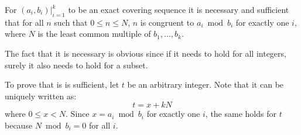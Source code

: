 \begin{solution}

\end{solution}

\begin{exercise}
    \label{ex:4-25}
    For $(a_i,b_i)\rvert_{i=1}^k$ to be an exact covering sequence it is necessary and sufficient that for all $n$ such that $ 0\leq n \leq N$, $n$ is congruent to $a_i \bmod b_i$ for exactly one $i$, where $N$ is the least common multiple of $b_1,\ldots,b_k$.
\end{exercise}
\begin{solution}
    The fact that it is necessary is obvious since if it needs to hold for all integers, surely it also needs to hold for a subset.

    To prove that is is sufficient, let $t$ be an arbitrary integer. Note that it can be uniquely written as:
    \[
        t = x + kN
    \]
    where $0\leq x < N$. Since $x = a_i\bmod b_i$ for exactly one $i$, the same holds for $t$ because $N\bmod b_i = 0$ for all $i$.
\end{solution}


